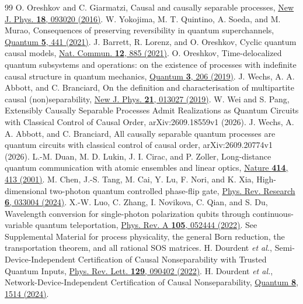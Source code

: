 \documentclass[11pt]{article}
\begin{document}
\begin{thebibliography}{99}
 O. Oreshkov and C. Giarmatzi, Causal and causally separable processes, \href{https://doi.org/10.1088/1367-2630/18/9/093020}{New J. Phys. \textbf{18}, 093020 (2016)}.
 W. Yokojima, M. T. Quintino, A. Soeda, and M. Murao, Consequences of preserving reversibility in quantum superchannels, \href{https://doi.org/10.22331/q-2021-04-26-441}{Quantum \textbf{5}, 441 (2021)}.
 J. Barrett, R. Lorenz, and O. Oreshkov, Cyclic quantum causal models, \href{https://doi.org/10.1038/s41467-020-20456-x}{Nat. Commun. \textbf{12}, 885 (2021)}.
 O. Oreshkov, Time-delocalized quantum subsystems and operations: on the existence of processes with indefinite causal structure in quantum mechanics, \href{https://doi.org/10.22331/q-2019-12-02-206}{Quantum \textbf{3}, 206 (2019)}.
 J. Wechs, A. A. Abbott, and C. Branciard, On the definition and characterisation of multipartite causal (non)separability, \href{https://doi.org/10.1088/1367-2630/aaf352}{New J. Phys. \textbf{21}, 013027 (2019)}.
 W. Wei and S. Pang, Extensibly Causally Separable Processes Admit Realizations as Quantum Circuits with Classical Control of Causal Order, arXiv:2609.18559v1 (2026).
 J. Wechs, A. A. Abbott, and C. Branciard, All causally separable quantum processes are quantum circuits with classical control of causal order, arXiv:2609.20774v1 (2026).
 L.-M. Duan, M. D. Lukin, J. I. Cirac, and P. Zoller, Long-distance quantum communication with atomic ensembles and linear optics, \href{https://doi.org/10.1038/35106500}{Nature \textbf{414}, 413 (2001)}.
 M. Chen, J.-S. Tang, M. Cai, Y. Lu, F. Nori, and K. Xia, High-dimensional two-photon quantum controlled phase-flip gate, \href{https://doi.org/10.1103/PhysRevResearch.6.033004}{Phys. Rev. Research \textbf{6}, 033004 (2024)}.
 X.-W. Luo, C. Zhang, I. Novikova, C. Qian, and S. Du, Wavelength conversion for single-photon polarization qubits through continuous-variable quantum teleportation, \href{https://doi.org/10.1103/PhysRevA.105.052444}{Phys. Rev. A \textbf{105}, 052444 (2022)}.
 See Supplemental Material for process physicality, the general Born reduction, the transportation theorem, and all rational SOS matrices.
 H. Dourdent \emph{et al.}, Semi-Device-Independent Certification of Causal Nonseparability with Trusted Quantum Inputs, \href{https://doi.org/10.1103/PhysRevLett.129.090402}{Phys. Rev. Lett. \textbf{129}, 090402 (2022)}.
 H. Dourdent \emph{et al.}, Network-Device-Independent Certification of Causal Nonseparability, \href{https://doi.org/10.22331/q-2024-10-30-1514}{Quantum \textbf{8}, 1514 (2024)}.

\end{thebibliography}
\end{document}
